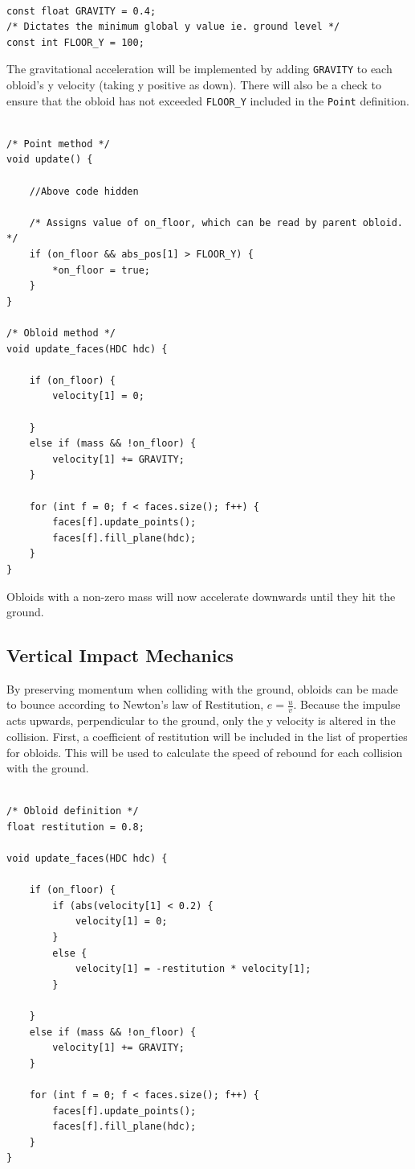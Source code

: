 \documentclass{article}
\begin{document}
\begin{lstlisting}

const float GRAVITY = 0.4;
/* Dictates the minimum global y value ie. ground level */
const int FLOOR_Y = 100;

\end{lstlisting}

The gravitational acceleration will be implemented by adding \verb|GRAVITY| to each obloid's y velocity (taking y positive as down). There will also be a check to ensure that the obloid has not exceeded \verb|FLOOR_Y| included in the \verb|Point| definition.
\newpage
\begin{lstlisting}

/* Point method */
void update() {
	
	//Above code hidden

	/* Assigns value of on_floor, which can be read by parent obloid. */
	if (on_floor && abs_pos[1] > FLOOR_Y) {
		*on_floor = true;
	}
}

/* Obloid method */
void update_faces(HDC hdc) {
	
	if (on_floor) {
		velocity[1] = 0;

	}
	else if (mass && !on_floor) {
		velocity[1] += GRAVITY;
	}
			
	for (int f = 0; f < faces.size(); f++) {
		faces[f].update_points();
		faces[f].fill_plane(hdc);
	}
}

\end{lstlisting}
Obloids with a non-zero mass will now accelerate downwards until they hit the ground.

\subsection{Vertical Impact Mechanics}

By preserving momentum when colliding with the ground, obloids can be made to bounce according to Newton's law of Restitution, $ e = \frac{u}{v} $. Because the impulse acts upwards, perpendicular to the ground, only the y velocity is altered in the collision. First, a coefficient of restitution will be included in the list of properties for obloids. This will be used to calculate the speed of rebound for each collision with the ground.
\newpage
\begin{lstlisting}

/* Obloid definition */
float restitution = 0.8;

void update_faces(HDC hdc) {
	
	if (on_floor) {
		if (abs(velocity[1] < 0.2) {	
			velocity[1] = 0;
		}
		else {
			velocity[1] = -restitution * velocity[1];
		}

	}
	else if (mass && !on_floor) {
		velocity[1] += GRAVITY;
	}
			
	for (int f = 0; f < faces.size(); f++) {
		faces[f].update_points();
		faces[f].fill_plane(hdc);
	}
}

\end{lstlisting}
\end{document}
